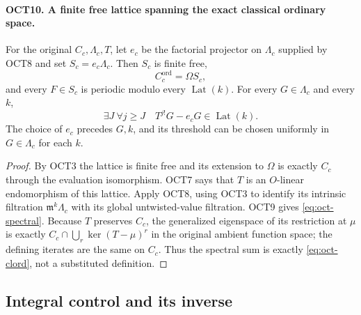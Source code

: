 \paragraph{OCT10. A finite free lattice spanning the exact classical ordinary space.}
\label{claim:OCT10}
For the original $C_c,\Lambda_c,T$, let $e_c$ be the factorial
projector on $\Lambda_c$ supplied by OCT8 and set
$S_c=e_c\Lambda_c$.  Then $S_c$ is finite free,
\begin{equation}\label{eq:oct-spectral}
                      C_c^{\mathrm{ord}}=\Omega S_c,
\end{equation}
and every $F\in S_c$ is periodic modulo every
$\operatorname{Lat}(k)$.  For every $G\in\Lambda_c$ and
every $k$,
\begin{equation}\label{eq:oct-classical-factorial}
 \exists J\ \forall j\geq J\quad
              T^{j!}G-e_cG\in\operatorname{Lat}(k).
\end{equation}
The choice of $e_c$ precedes $G,k$, and its threshold can be
chosen uniformly in $G\in\Lambda_c$ for each $k$.
\begin{proof}
By OCT3 the lattice is finite free and its extension to
$\Omega$ is exactly $C_c$ through the evaluation isomorphism.
OCT7 says that $T$ is an $O$-linear endomorphism of this
lattice.  Apply OCT8, using OCT3 to identify its intrinsic
filtration $\mathfrak m^k\Lambda_c$ with its global
untwisted-value filtration.  OCT9 gives
\eqref{eq:oct-spectral}.  Because $T$ preserves $C_c$,
the generalized eigenspace of its restriction at $\mu$ is
exactly $C_c\cap\bigcup_r\ker(T-\mu)^r$ in the original
ambient function space; the defining iterates are the same
on $C_c$.  Thus the spectral sum is exactly
\eqref{eq:oct-clord}, not a substituted definition.
\end{proof}

\subsection{Integral control and its inverse}

